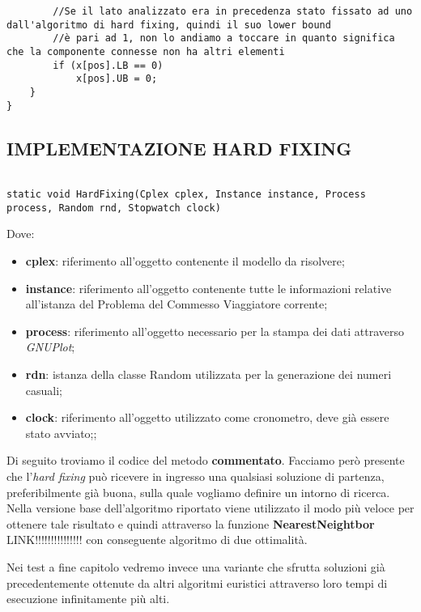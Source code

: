 \documentclass[11pt]{article}
\begin{document}
\begin{lstlisting}
        //Se il lato analizzato era in precedenza stato fissato ad uno dall'algoritmo di hard fixing, quindi il suo lower bound
        //è pari ad 1, non lo andiamo a toccare in quanto significa che la componente connesse non ha altri elementi
        if (x[pos].LB == 0)
            x[pos].UB = 0;
    }
}

\end{lstlisting}

\subsection*{IMPLEMENTAZIONE HARD FIXING}

\begin{lstlisting}

static void HardFixing(Cplex cplex, Instance instance, Process process, Random rnd, Stopwatch clock)

\end{lstlisting}

Dove:

\begin{itemize}
    \item \textbf{cplex}: riferimento all'oggetto contenente il modello da risolvere;
    \item \textbf{instance}: riferimento all'oggetto contenente tutte le informazioni relative all'istanza del Problema del Commesso Viaggiatore corrente;
    \item \textbf{process}: riferimento all'oggetto necessario per la stampa dei dati attraverso \textit{GNUPlot};
    \item \textbf{rdn}: istanza della classe Random utilizzata per la generazione dei numeri casuali;
    \item \textbf{clock}: riferimento all'oggetto utilizzato come cronometro, deve già essere stato avviato;;
\end{itemize}

Di seguito troviamo il codice del metodo \textbf{commentato}. Facciamo però presente che l'\textit{hard fixing} può ricevere in ingresso una qualsiasi soluzione di partenza, preferibilmente già buona, sulla quale vogliamo definire un intorno di ricerca. Nella versione base dell'algoritmo riportato viene utilizzato il modo più veloce per ottenere tale risultato e quindi attraverso la funzione \textbf{NearestNeightbor} LINK!!!!!!!!!!!!!!! con conseguente algoritmo di due ottimalità.

Nei test a fine capitolo vedremo invece una variante che sfrutta soluzioni già precedentemente ottenute da altri algoritmi euristici attraverso loro tempi di esecuzione infinitamente più alti.
\end{document}
